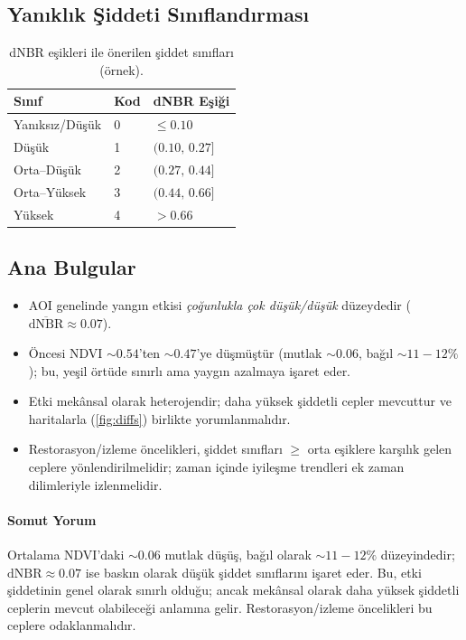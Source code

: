 \documentclass[11pt,a4paper]{article}
\begin{document}
\subsection*{Yanıklık Şiddeti Sınıflandırması}
\begin{table}[h]
  \centering
  \begin{tabular}{@{}lll@{}}\toprule
  Sınıf & Kod & dNBR Eşiği \\\midrule
  Yanıksız/Düşük & 0 & $\leq 0.10$ \\
  Düşük & 1 & $(0.10,\,0.27]$ \\
  Orta--Düşük & 2 & $(0.27,\,0.44]$ \\
  Orta--Yüksek & 3 & $(0.44,\,0.66]$ \\
  Yüksek & 4 & $> 0.66$ \\\bottomrule
  \end{tabular}
  \caption{dNBR eşikleri ile önerilen şiddet sınıfları (örnek).}
\end{table}

\subsection*{Ana Bulgular}
\begin{itemize}
  \item AOI genelinde yangın etkisi \emph{çoğunlukla çok düşük/düşük} düzeydedir (\(\overline{\mathrm{dNBR}} \approx 0.07\)).
  \item Öncesi NDVI \(\sim0.54\)'ten \(\sim0.47\)'ye düşmüştür (mutlak \(\sim0.06\), bağıl \(\sim11{-}12\%\)); bu, yeşil örtüde sınırlı ama yaygın azalmaya işaret eder.
  \item Etki mekânsal olarak heterojendir; daha yüksek şiddetli cepler mevcuttur ve haritalarla (\ref{fig:diffs}) birlikte yorumlanmalıdır.
  \item Restorasyon/izleme öncelikleri, şiddet sınıfları \(\geq\) orta eşiklere karşılık gelen ceplere yönlendirilmelidir; zaman içinde iyileşme trendleri ek zaman dilimleriyle izlenmelidir.
\end{itemize}

\paragraph{Somut Yorum} Ortalama NDVI’daki \(\sim0.06\) mutlak düşüş, bağıl olarak \(\sim11{-}12\%\) düzeyindedir; \(\mathrm{dNBR} \approx 0.07\) ise baskın olarak düşük şiddet sınıflarını işaret eder. Bu, etki şiddetinin genel olarak sınırlı olduğu; ancak mekânsal olarak daha yüksek şiddetli ceplerin mevcut olabileceği anlamına gelir. Restorasyon/izleme öncelikleri bu ceplere odaklanmalıdır.
\end{document}
